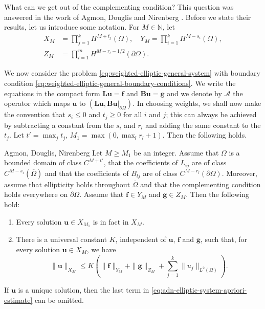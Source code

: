 What can we get out of the complementing condition? This question was answered in the work of Agmon, Douglis and Nirenberg \cite{ADN2}. Before we state their results, let us introduce some notation. For $M\in\mathbb{N}$, let
\begin{equation}\label{eq:adn-weighted-sobolev-domain-data-spaces}
\begin{aligned}
X_M&=\prod_{j=1}^kH^{M+t_j}(\Omega),\quad Y_M=\prod_{i=1}^kH^{M-s_i}(\Omega),\\
Z_M&=\prod_{l=1}^mH^{M-r_l-1/2}(\partial\Omega).
\end{aligned}
\end{equation}


We now consider the problem \eqref{eq:weighted-elliptic-general-system} with boundary condition \eqref{eq:weighted-elliptic-general-boundary-conditions}. We write the equations in the compact form $\bm{L}\bm{u}=\bm{f}$ and $\bm{B}\bm{u}=\bm{g}$ and we denote by $\mathcal{A}$ the operator which maps $\bm{u}$ to $(\bm{L}\bm{u},\bm{B}\bm{u}|_{\partial\Omega})$. In choosing weights, we shall now make the convention that $s_i\leq0$ and $t_j\geq0$ for all $i$ and $j$; this can always be achieved by subtracting a constant from the $s_i$ and $r_l$ and adding the same constant to the $t_j$. Let $t\prime=\max_jt_j$, $M_1=\max(0,\max_lr_l+1)$. Then the following holds.

\begin{Theorem}{Agmon, Douglis, Nirenberg}
\label{thm:agmon-douglis-nirenberg-elliptic-estimate}
Let $M\geq M_1$ be an integer. Assume that $\Omega$ is a bounded domain of class $C^{M+t\prime}$, that the coefficients of $L_{ij}$ are of class $C^{M-s_i}(\overline\Omega)$ and that the coefficients of $B_{lj}$ are of class $C^{M-r_l}(\partial\Omega)$. Moreover, assume that ellipticity holds throughout $\overline\Omega$ and that the complementing condition holds everywhere on $\partial\Omega$. Assume that $\bm{f}\in Y_M$ and $\bm{g}\in Z_M$. Then the following hold:\begin{enumerate}\item Every solution $\bm{u}\in X_{M_1}$ is in fact in $X_M$.\item There is a universal constant $K$, independent of $\bm{u}$, $\bm{f}$ and $\bm{g}$, such that, for every solution $\bm{u}\in X_M$, we have
\begin{equation}\label{eq:adn-elliptic-system-apriori-estimate}
\|\bm{u}\|_{X_M}\leq K\left(\|\bm{f}\|_{Y_M}+\|\bm{g}\|_{Z_M}+\sum_{j=1}^k\|u_j\|_{L^2(\Omega)}\right).
\end{equation}
\end{enumerate}If $\bm{u}$ is a unique solution, then the last term in \eqref{eq:adn-elliptic-system-apriori-estimate} can be omitted.
\end{Theorem}

